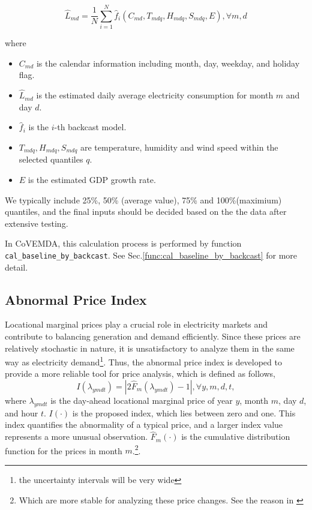 \documentclass[10pt]{article}
\newcommand{\covemda}{CoVEMDA}
\numberwithin{equation}{section}
\numberwithin{table}{section}
\numberwithin{figure}{section}
\begin{document}
\begin{equation*}
  \hat L_{md}=\frac{1}{N}\sum\limits_{i=1}^N \hat f_i(C_{md}, T_{mdq}, H_{mdq}, S_{mdq}, E),\forall m,d
\end{equation*}

where 
\begin{itemize}
  \item $C_{md}$ is the calendar information including month, day, weekday, and holiday flag.
  \item $\hat L_{md}$ is the estimated daily average electricity consumption for month $m$ and day $d$.
  \item $\hat f_i$ is the $i$-th backcast model.
  \item $T_{mdq},H_{mdq},S_{mdq}$ are temperature, humidity and wind speed within the selected quantiles $q$.
  \item $E$ is the estimated GDP growth rate.
\end{itemize}
We typically include 25\%, 50\% (average value), 75\% and 100\%(maximium) quantiles, and the final inputs should be decided based on the the data after extensive testing.

In \covemda{}, this calculation process is performed by function \verb!cal_baseline_by_backcast!. See Sec.\ref{func:cal_baseline_by_backcast} for more detail.



\subsection{Abnormal Price Index}\label{subsec:abnormal_price_index}

Locational marginal prices play a crucial role in electricity markets and contribute to balancing generation and demand efficiently. Since these prices are relatively stochastic in nature, it is unsatisfactory to analyze them in the same way as electricity demand\footnote{the uncertainty intervals will be very wide}. Thus, the abnormal price index is developed to provide a more reliable tool for price analysis, which is defined as follows,
\begin{equation*}
  I(\lambda_{ymdt})=|2\hat F_m(\lambda_{ymdt})-1|, \forall y,m,d,t,
\end{equation*}
where $\lambda_{ymdt}$ is the day-ahead locational marginal price of year $y$, month $m$, day $d$, and hour $t$. $I(\cdot)$ is the proposed index, which lies between zero and one. This index quantifies the abnormality of a typical price, and a larger index value represents a more unusual observation. $\hat F_m(\cdot)$ is the cumulative distribution function for the prices in month $m$.\footnote{Which are more stable for analyzing these price changes. See the reason in \cite{quantitaveassess}}.
\end{document}
